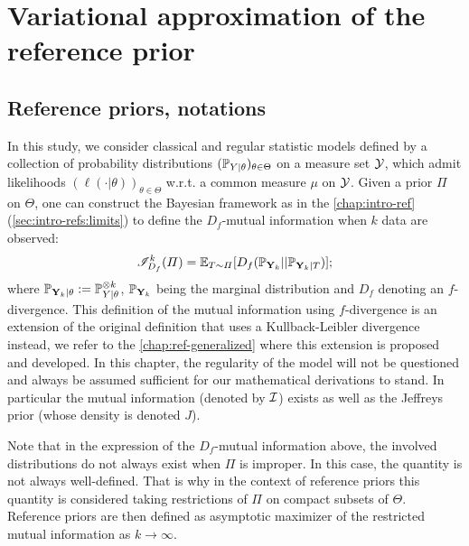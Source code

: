 \section{Variational approximation of the reference prior}

\subsection{Reference priors, notations}


In this study, we consider classical and regular statistic models defined by a collection of probability distributions $(\mathbb{P}_{Y|\theta})_{\theta\in\Theta}$ on a measure set $\mathcal{Y}$, which admit likelihoods $(\ell(\cdot|\theta))_{\theta\in\Theta}$ w.r.t. a common measure $\mu$ on $\mathcal{Y}$.
Given a prior $\varPi$ on $\Theta$, one can construct the Bayesian framework as in the \cref{chap:intro-ref} (\cref{sec:intro-refs:limits}) to define the $D_f$-mutual information when $k$ data are observed:
    \begin{equation}
        \mathscr{I}_{D_f}^k(\varPi) = \mathbb{E}_{T\sim\varPi}[D_f(\mathbb{P}_{\mathbf{Y}_k}||\mathbb{P}_{\mathbf{Y}_k|T} ) ];
    \end{equation}
where $\mathbb{P}_{\mathbf{Y}_k|\theta}:= \mathbb{P}_{Y|\theta}^{\otimes k} $, $\mathbb{P}_{\mathbf{Y}_k}$ being the marginal distribution and $D_f$ denoting an $f$-divergence.
This definition of the mutual information using $f$-divergence is an extension of the original definition that uses a Kullback-Leibler divergence instead, we refer to the \cref{chap:ref-generalized} where this extension is proposed and developed.
In this chapter, the regularity of the model will not be questioned and always be assumed sufficient for our mathematical derivations to stand. In particular the mutual information (denoted by $\mathcal{I}$) exists as well as the Jeffreys prior (whose density is denoted $J$).


Note that in the expression of the $D_f$-mutual information above, the involved distributions 
do not always exist when $\varPi$ is improper. In this case, the quantity is not always well-defined. That is why in the context of reference priors this quantity is considered taking restrictions of $\varPi$ on compact subsets of $\Theta$. 
Reference priors are then defined as asymptotic maximizer of the restricted mutual information as $k\to\infty$.


